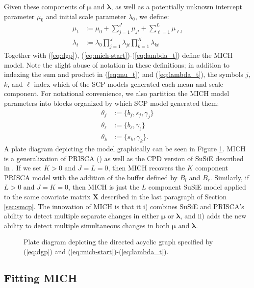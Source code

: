 Given these components of $\pmb{\mu}$ and $\pmb{\lambda}$, as well as a potentially unknown intercept parameter $\mu_0$ and initial scale parameter $\lambda_0$, we define:
\begin{align}
    \mu_{t} &:= \mu_0 + \sum_{j = 1}^J \mu_{jt}  + \sum_{\ell = 1}^L \mu_{\ell t} \label{eq:mu_t}\\
    \lambda_t &:= \lambda_0\prod_{j=1}^J \lambda_{jt}\prod_{k=1}^K \lambda_{kt} \label{eq:lambda_t}
\end{align}
Together with (\ref{eq:dgp}), (\ref{eq:mich-start})-(\ref{eq:lambda_t}) define the MICH model. Note the slight abuse of notation in these definitions; in addition to indexing the sum and product in (\ref{eq:mu_t}) and (\ref{eq:lambda_t}), the symbols $j$, $k$, and $\ell$ index which of the SCP models generated each mean and scale component. For notational convenience, we also partition the MICH model parameters into blocks organized by which SCP model generated them: 
\begin{align}
    \theta_j &:= \{b_j,s_j,\gamma_j\} \\
    \theta_\ell &:= \{b_\ell, \gamma_\ell\} \\
    \theta_k &:= \{s_k, \gamma_k\}.
\end{align}
A plate diagram depicting the model graphically can be seen in Figure \ref{fig:plate-diagram}. MICH is a generalization of PRISCA (\citealp{Cappello22}) as well as the CPD version of SuSiE described in \cite{Wang20}. If we set $K > 0$ and $J=L=0$, then MICH recovers the $K$ component PRISCA model with the addition of the buffer defined by $B_l$ and $B_r$. Similarly, if $L > 0$ and $J=K=0$, then MICH is just the $L$ component SuSiE model applied to the same covariate matrix $\mathbf{X}$ described in the last paragraph of Section \ref{sec:smcp}. The innovation of MICH is that it i) combines SuSiE and PRISCA's ability to detect multiple separate changes in either $\pmb{\mu}$ or $\pmb{\lambda}$, and ii) adds the new ability to detect multiple simultaneous changes in both $\pmb{\mu}$ and $\pmb{\lambda}$.

\begin{figure}
    \centering
    
    \caption{Plate diagram depicting the directed acyclic graph specified by (\ref{eq:dgp}) and (\ref{eq:mich-start})-(\ref{eq:lambda_t}).}
    \label{fig:plate-diagram}
\end{figure}  

\subsection{Fitting MICH}

